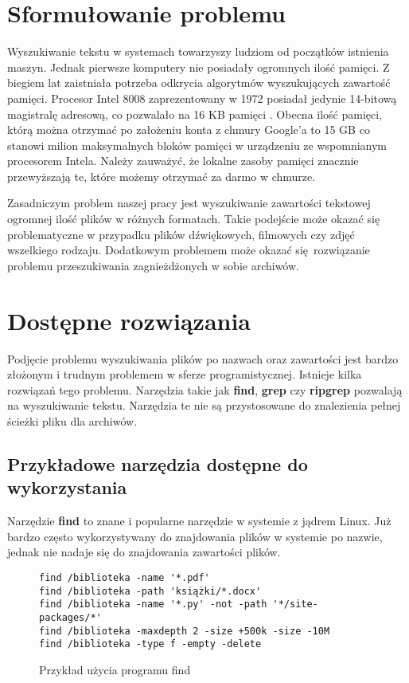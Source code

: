 \section{Sformułowanie problemu}
Wyszukiwanie tekstu w systemach towarzyszy ludziom od początków istnienia maszyn.
Jednak pierwsze komputery nie posiadały ogromnych ilość pamięci. Z biegiem lat
zaistniała potrzeba odkrycia algorytmów wyszukujących zawartość pamięci. 
Procesor Intel 8008 zaprezentowany w 1972 posiadał jedynie 14-bitową magistralę
adresową, co pozwalało na 16 KB pamięci \cite{bib:internet:Intel8008}. 
Obecna ilość pamięci, którą można otrzymać po założeniu konta z chmury Google'a to 15 GB
\cite{bib:internet:GoogleCloud} co stanowi milion maksymalnych bloków pamięci w 
urządzeniu ze wspomnianym procesorem Intela. Należy zauważyć, że lokalne zasoby
 pamięci znacznie przewyższają te, które możemy otrzymać za darmo w chmurze.

Zasadniczym problem naszej pracy jest wyszukiwanie zawartości tekstowej
ogromnej ilość plików w różnych formatach. Takie podejście może okazać się 
problematyczne \newline w przypadku plików dźwiękowych, filmowych czy zdjęć
wszelkiego rodzaju. Dodatkowym problemem może okazać się rozwiązanie problemu
przeszukiwania zagnieżdżonych w sobie archiwów.

\section{Dostępne rozwiązania} %

Podjęcie problemu wyszukiwania plików po nazwach oraz zawartości jest bardzo
złożonym i trudnym problemem w sferze programistycznej. Istnieje kilka rozwiązań
tego problemu. Narzędzia takie jak \textbf{find}, \textbf{grep} czy \textbf{ripgrep} 
\cite{bib:internet:ripgrep} pozwalają na wyszukiwanie tekstu. Narzędzia te nie 
są przystosowane do znalezienia pełnej ścieżki pliku dla archiwów.

\subsection{Przykładowe narzędzia dostępne do wykorzystania}

Narzędzie \textbf{find} to znane i popularne narzędzie w systemie z jądrem Linux.
Już bardzo często wykorzystywany do znajdowania plików w systemie po nazwie, 
jednak nie nadaje się do znajdowania zawartości plików.

\begin{figure}[h]
  \centering
\begin{tcolorbox}[
    colback=white,
    colframe=black,
    boxrule=0.5pt,
    arc=0pt
]
  \begin{verbatim}
find /biblioteka -name '*.pdf'
find /biblioteka -path 'książki/*.docx' 
find /biblioteka -name '*.py' -not -path '*/site-packages/*'  
find /biblioteka -maxdepth 2 -size +500k -size -10M           
find /biblioteka -type f -empty -delete 
  \end{verbatim}
\end{tcolorbox}
\caption{Przykład użycia programu find}
\label{fig:cmd:findExamples}
\end{figure}


